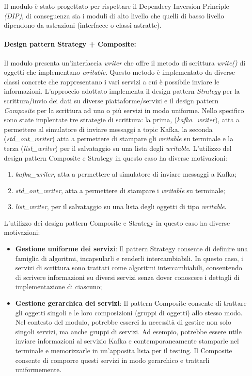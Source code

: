 Il modulo è stato progettato per rispettare il Dependecy Inversion Principle \textit{(DIP)}, di conseguenza sia i moduli di alto livello che quelli di basso livello dipendono da astrazioni (interfacce o classi astratte).

\paragraph{Design pattern Strategy + Composite:}
Il modulo presenta un'interfaccia \textit{writer} che offre il metodo di scrittura \textit{write()} di oggetti che implementano \textit{writable}.
Questo metodo è implementato da diverse classi concrete che rappresentano i vari servizi a cui è possibile inviare le informazioni.
L'approccio adottato implementa il design pattern \textit{Strategy} per la scrittura/invio dei dati su diverse piattaforme/servizi e il design pattern \textit{Composite} per la scrittura ad uno o più servizi in modo uniforme.
Nello specifico sono state implentate tre strategie di scrittura: la prima, (\textit{kafka\_writer}), atta a permettere al simulatore di inviare messaggi a topic Kafka,  la seconda (\textit{std\_out\_writer}) atta a permettere di stampare gli \textit{writable} su terminale e la terza (\textit{list\_writer}) per il salvataggio su una lista degli \textit{writable}.
L'utilizzo del design pattern Composite e Strategy in questo caso ha diverse motivazioni:

\begin{enumerate}
    \item \textit{kafka\_writer}, atta a permettere al simulatore di inviare messaggi a Kafka;
    \item \textit{std\_out\_writer}, atta a permettere di stampare i \textit{writable} su terminale;
    \item \textit{list\_writer}, per il salvataggio su una lista degli oggetti di tipo \textit{writable}.
\end{enumerate}
L'utilizzo dei design pattern Composite e Strategy in questo caso ha diverse motivazioni:
\begin{itemize}
    \item \textbf{Gestione uniforme dei servizi}: Il pattern Strategy consente di definire una famiglia di algoritmi, incapsularli e renderli intercambiabili. In questo caso, i servizi di scrittura sono trattati come algoritmi intercambiabili, consentendo di scrivere informazioni su diversi servizi senza dover conoscere i dettagli di implementazione di ciascuno;
    \item \textbf{Gestione gerarchica dei servizi}: Il pattern Composite consente di trattare gli oggetti singoli e le loro composizioni (gruppi di oggetti) allo stesso modo. \\
    Nel contesto del modulo, potrebbe esserci la necessità di gestire non solo singoli servizi, ma anche gruppi di servizi. Ad esempio, potrebbe essere utile inviare informazioni al servizio Kafka e contemporaneamente stamparle nel terminale e memorizzarle in un'apposita lista per il testing. Il Composite consente di comporre questi servizi in modo gerarchico e trattarli uniformemente.
\end{itemize}

